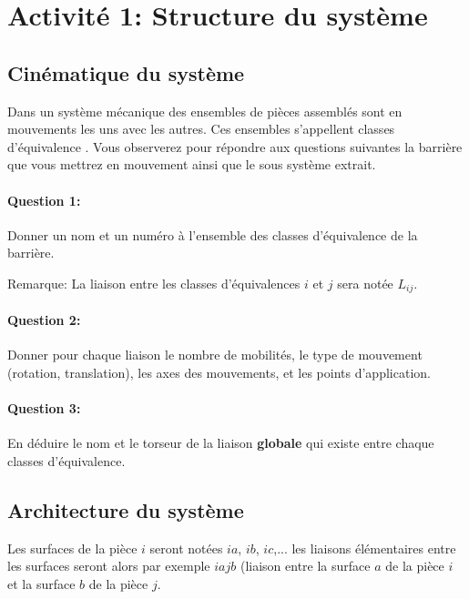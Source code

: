 

\section{Activité 1: Structure du système}

\subsection{Cinématique du système}

Dans un système mécanique des ensembles de pièces assemblés sont en mouvements les uns avec les autres. Ces ensembles s'appellent \og classes d'équivalence \fg. Vous observerez pour répondre aux questions suivantes la barrière que vous mettrez en mouvement ainsi que le sous système extrait.

\paragraph{Question 1:} Donner un nom et un  numéro à l'ensemble des classes d'équivalence de la barrière.

\reponse[3]

Remarque: La liaison entre les classes d'équivalences $i$ et $j$ sera notée $L_{ij}$.

\paragraph{Question 2:} Donner pour chaque liaison le nombre de mobilités, le type de mouvement (rotation, translation), les axes des mouvements, et les points d'application.

\reponse[3]

\paragraph{Question 3:} En déduire le nom et le torseur de la liaison \textbf{globale} qui existe entre chaque classes d'équivalence.

\reponse[3]

\subsection{Architecture du système}

Les surfaces de la pièce $i$ seront notées $ia$, $ib$, $ic$,... les liaisons élémentaires entre les surfaces seront alors par exemple $iajb$ (liaison entre la surface $a$ de la pièce $i$ et la surface $b$ de la pièce $j$.

